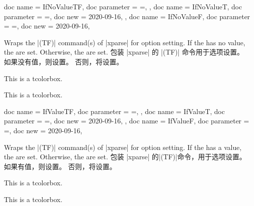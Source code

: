 \begin{docTcbKeys}[doc description = {no default}]
  {
    {
      doc name        = IfNoValueTF,
      doc parameter   = {=},
    },
    {
      doc name        = IfNoValueT,
      doc parameter   = {=},
      doc new         = 2020-09-16,
    },
    {
      doc name        = IfNoValueF,
      doc parameter   = {=},
      doc new         = 2020-09-16,
    }
  }
\begin{stripedbox}
Wraps the |\IfNoValue(TF)| command(s) of |xparse| for option setting.
If the  has no value, the  are set.
Otherwise, the  are set.
\tcblower
包装 |xparse| 的 |\IfNoValue(TF)| 命令用于选项设置。%
如果没有值，则设置。%
否则，将设置。
\end{stripedbox}
\begin{dispExample}

\begin{mybox}
This is a tcolorbox.
\end{mybox}

\begin{mybox}
This is a tcolorbox.
\end{mybox}
\end{dispExample}
\end{docTcbKeys}

\clearpage
\begin{docTcbKeys}[doc description = {no default}]
  {
    {
      doc name        = IfValueTF,
      doc parameter   = {=},
    },
    {
      doc name        = IfValueT,
      doc parameter   = {=},
      doc new         = 2020-09-16,
    },
    {
      doc name        = IfValueF,
      doc parameter   = {=},
      doc new         = 2020-09-16,
    }
  }
\begin{stripedbox}
Wraps the |\IfValue(TF)| command(s) of |xparse| for option setting.
If the  has a value, the  are set.
Otherwise, the  are set.
\tcblower
包装 |xparse| 的|\IfValue(TF)|命令，用于选项设置。%
如果有值，则设置。%
否则，将设置。
\end{stripedbox}

\begin{dispExample}

\begin{mybox}
This is a tcolorbox.
\end{mybox}

\begin{mybox}[My title]
This is a tcolorbox.
\end{mybox}
\end{dispExample}
\end{docTcbKeys}

